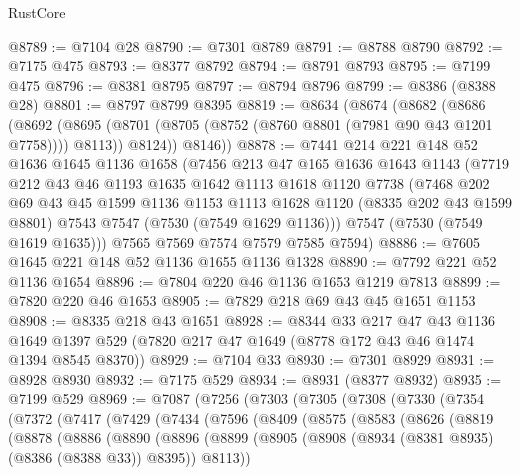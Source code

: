 \begin{lexlean}{RustCore}
\begin{coremodule}
@8789 := @7104 @28
@8790 := @7301 @8789
@8791 := @8788 @8790
@8792 := @7175 @475
@8793 := @8377 @8792
@8794 := @8791 @8793
@8795 := @7199 @475
@8796 := @8381 @8795
@8797 := @8794 @8796
@8799 := @8386 (@8388 @28)
@8801 := @8797 @8799 @8395
@8819 := @8634
    (@8674
      (@8682
        (@8686
          (@8692
            (@8695 (@8701 (@8705 (@8752 (@8760 @8801 (@7981 @90 @43 @1201 @7758)))) @8113))
            @8124))
        @8146))
@8878 := @7441
    @214
    @221
    @148
    @52
    @1636
    @1645
    @1136
    @1658
    (@7456
      @213
      @47
      @165
      @1636
      @1643
      @1143
      (@7719
        @212
        @43
        @46
        @1193
        @1635
        @1642
        @1113
        @1618
        @1120
        @7738
        (@7468
          @202
          @69
          @43
          @45
          @1599
          @1136
          @1153
          @1113
          @1628
          @1120
          (@8335 @202 @43 @1599 @8801)
          @7543
          @7547
          (@7530 (@7549 @1629 @1136)))
        @7547
        (@7530 (@7549 @1619 @1635)))
      @7565
      @7569
      @7574
      @7579
      @7585
      @7594)
@8886 := @7605 @1645 @221 @148 @52 @1136 @1655 @1136 @1328
@8890 := @7792 @221 @52 @1136 @1654
@8896 := @7804 @220 @46 @1136 @1653 @1219 @7813
@8899 := @7820 @220 @46 @1653
@8905 := @7829 @218 @69 @43 @45 @1651 @1153
@8908 := @8335 @218 @43 @1651
@8928 := @8344
    @33
    @217
    @47
    @43
    @1136
    @1649
    @1397
    @529
    (@7820 @217 @47 @1649 (@8778 @172 @43 @46 @1474 @1394 @8545 @8370))
@8929 := @7104 @33
@8930 := @7301 @8929
@8931 := @8928 @8930
@8932 := @7175 @529
@8934 := @8931 (@8377 @8932)
@8935 := @7199 @529
@8969 := @7087
    (@7256
      (@7303
        (@7305
          (@7308
            (@7330
              (@7354
                (@7372
                  (@7417
                    (@7429
                      (@7434
                        (@7596
                          (@8409
                            (@8575
                              (@8583
                                (@8626
                                  (@8819
                                    (@8878
                                      (@8886
                                        (@8890
                                          (@8896
                                            (@8899
                                              (@8905
                                                (@8908
                                                  (@8934 (@8381 @8935) (@8386 (@8388 @33)) @8395))
                                                @8113))

\end{coremodule}
\end{lexlean}
